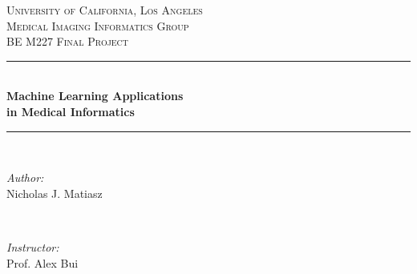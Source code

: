 \documentclass[12pt]{article} %
\begin{document}
\begin{titlepage}

\newcommand{\HRule}{\rule{\linewidth}{0.5mm}} %

\center %
 

\textsc{\Large University of California, Los Angeles}\\[1.5cm] %
\textsc{\large Medical Imaging Informatics Group}\\[0.5cm] %
\textsc{\large BE M227 Final Project}\\[0.5cm] %

\vspace{20pt}
\HRule \\[0.5cm]
\LARGE{\textbf{Machine Learning Applications}}\\[.3cm]
\LARGE{\textbf{in Medical Informatics}}\\
\HRule \\[1.5cm]
 

\begin{minipage}{0.4\textwidth}
\begin{flushleft} \large
\emph{Author:}\\
Nicholas J. Matiasz %
\end{flushleft}
\end{minipage}
~
\begin{minipage}{0.4\textwidth}
\begin{flushright} \large
\emph{Instructor:} \\
Prof. Alex Bui %
\end{flushright}
\end{minipage}\\[4cm]


\end{titlepage}
\end{document}
